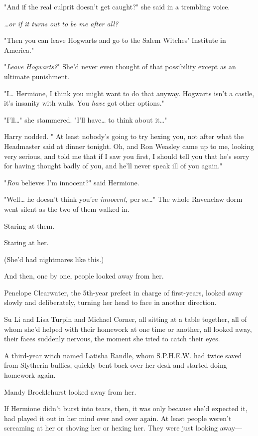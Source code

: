 "And if the real culprit doesn't get caught?" she said in a trembling voice.

\emph{{\ldots}or if it turns out to be me after all?}

"Then you can leave Hogwarts and go to the Salem Witches' Institute in America."

"\emph{Leave Hogwarts?}" She'd never even thought of that possibility except as 
an ultimate punishment.

"I{\ldots} Hermione, I think you might want to do that anyway. Hogwarts isn't a 
castle, it's insanity with walls. You \emph{have} got other options."

"I'll{\ldots}" she stammered. "I'll have{\ldots} to think about it{\ldots}"

Harry nodded. " At least nobody's going to try hexing you, not after what the 
Headmaster said at dinner tonight. Oh, and Ron Weasley came up to me, looking 
very serious, and told me that if I saw you first, I should tell you that he's 
sorry for having thought badly of you, and he'll never speak ill of you again."

"\emph{Ron} believes I'm innocent?" said Hermione.

"Well{\ldots} he doesn't think you're \emph{innocent,} per se{\ldots}"
\sbreak
The whole Ravenclaw dorm went silent as the two of them walked in.

Staring at them.

Staring at her.

(She'd had nightmares like this.)

And then, one by one, people looked away from her.

Penelope Clearwater, the 5th-year prefect in charge of first-years, looked away 
slowly and deliberately, turning her head to face in another direction.

Su Li and Lisa Turpin and Michael Corner, all sitting at a table together, all 
of whom she'd helped with their homework at one time or another, all looked 
away, their faces suddenly nervous, the moment she tried to catch their eyes.

A third-year witch named Latisha Randle, whom S.P.H.E.W. had twice saved from 
Slytherin bullies, quickly bent back over her desk and started doing homework 
again.

Mandy Brocklehurst looked away from her.

If Hermione didn't burst into tears, then, it was only because she'd expected 
it, had played it out in her mind over and over again. At least people weren't 
screaming at her or shoving her or hexing her. They were just looking away---

